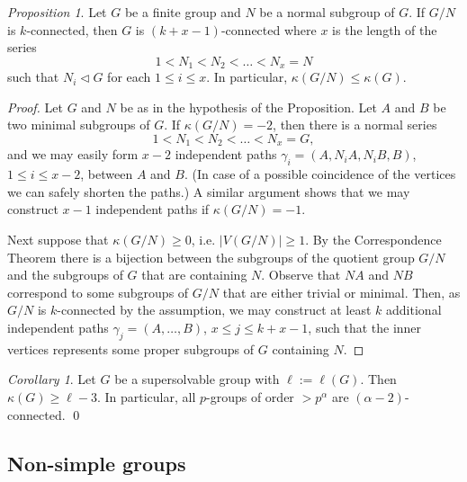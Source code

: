 \documentclass[a4paper,12pt]{article}
\theoremstyle{definition}
\theoremstyle{remark}
\theoremstyle{theorem}
\newtheorem{cor}[theorem]{Corollary}
\newtheorem{prop}[theorem]{Proposition}
\begin{document}
\begin{prop}
  Let $G$ be a finite group and $N$ be a normal subgroup of $G$. If
  $G/N$ is $k$-connected, then $G$ is $(k+x-1)$-connected where $x$ is
  the length of the series $$1<N_1<N_2<\dots<N_x=N $$ such that
  $N_i\triangleleft G$ for each $1\leq i\leq x$. In particular,
  $\kappa(G/N)\leq \kappa(G)$.
\end{prop}


\begin{proof}
  Let $G$ and $N$ be as in the hypothesis of the Proposition. Let $A$
  and $B$ be two minimal subgroups of $G$. If $\kappa(G/N)=-2$, then
  there is a normal series $$ 1<N_1<N_2<\dots<N_x=G, $$ and we may
  easily form $x-2$ independent paths $\gamma_i=(A,N_iA,N_iB,B)$,
  $1\leq i\leq x-2$, between $A$ and $B$. (In case of a possible
  coincidence of the vertices we can safely shorten the paths.) A
  similar argument shows that we may construct $x-1$ independent paths
  if $\kappa(G/N)=-1$.

  Next suppose that $\kappa(G/N)\geq 0$, i.e. $|V(G/N)|\geq 1$. By the
  Correspondence Theorem there is a bijection between the subgroups of
  the quotient group $G/N$ and the subgroups of $G$ that are
  containing $N$. Observe that $NA$ and $NB$ correspond to some
  subgroups of $G/N$ that are either trivial or minimal. Then, as
  $G/N$ is $k$-connected by the assumption, we may construct at least
  $k$ additional independent paths $\gamma_j=(A,\dots,B)$,
  $x\leq j\leq k+x-1$, such that the inner vertices represents some proper subgroups of $G$ containing $N$.
\end{proof}

\begin{cor}\label{cor:order}
  Let $G$ be a supersolvable group with $\ell:=\ell(G)$. Then
  $\kappa(G)\geq \ell-3$. In particular, all $p$-groups of order
  $> p^{\alpha}$ are $(\alpha - 2)$-connected. \qed
\end{cor}



\subsection*{Non-simple groups}
\end{document}
